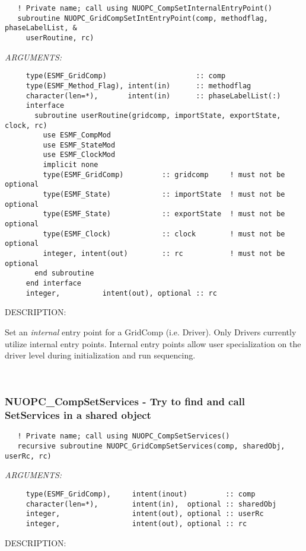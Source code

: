   
\begin{verbatim}   ! Private name; call using NUOPC_CompSetInternalEntryPoint()
   subroutine NUOPC_GridCompSetIntEntryPoint(comp, methodflag, phaseLabelList, &
     userRoutine, rc)\end{verbatim}{\em ARGUMENTS:}
\begin{verbatim}     type(ESMF_GridComp)                     :: comp
     type(ESMF_Method_Flag), intent(in)      :: methodflag
     character(len=*),       intent(in)      :: phaseLabelList(:)
     interface
       subroutine userRoutine(gridcomp, importState, exportState, clock, rc)
         use ESMF_CompMod
         use ESMF_StateMod
         use ESMF_ClockMod
         implicit none
         type(ESMF_GridComp)         :: gridcomp     ! must not be optional
         type(ESMF_State)            :: importState  ! must not be optional
         type(ESMF_State)            :: exportState  ! must not be optional
         type(ESMF_Clock)            :: clock        ! must not be optional
         integer, intent(out)        :: rc           ! must not be optional
       end subroutine
     end interface
     integer,          intent(out), optional :: rc \end{verbatim}
{\sf DESCRIPTION:\\ }


   Set an {\em internal} entry point for a GridComp (i.e. Driver). Only Drivers 
   currently utilize internal entry points. Internal entry points allow user
   specialization on the driver level during initialization and run sequencing. 
 
\mbox{}\hrulefill\ 
 
\subsubsection [NUOPC\_CompSetServices] {NUOPC\_CompSetServices - Try to find and call SetServices in a shared object}


\begin{verbatim}   ! Private name; call using NUOPC_CompSetServices()
   recursive subroutine NUOPC_GridCompSetServices(comp, sharedObj, userRc, rc)\end{verbatim}{\em ARGUMENTS:}
\begin{verbatim}     type(ESMF_GridComp),     intent(inout)         :: comp
     character(len=*),        intent(in),  optional :: sharedObj
     integer,                 intent(out), optional :: userRc
     integer,                 intent(out), optional :: rc\end{verbatim}
{\sf DESCRIPTION:\\ }


